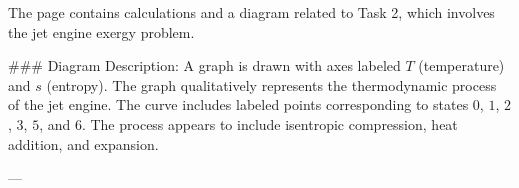 The page contains calculations and a diagram related to Task 2, which involves the jet engine exergy problem.  

### Diagram Description:  
A graph is drawn with axes labeled \( T \) (temperature) and \( s \) (entropy). The graph qualitatively represents the thermodynamic process of the jet engine. The curve includes labeled points corresponding to states \( 0 \), \( 1 \), \( 2 \), \( 3 \), \( 5 \), and \( 6 \). The process appears to include isentropic compression, heat addition, and expansion.  

---